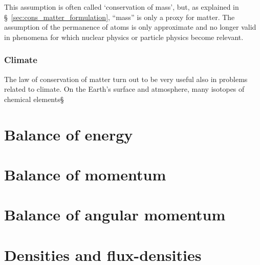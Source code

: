 \documentclass[a4paper,12pt,%
onecolumn,oneside,titlepage,%
british%
]{memoir}
\renewcommand*{\|}[1][]{\nonscript\:#1\vert\nonscript\:\mathopen{}}
\newcommand*{\sect}{\S}%
\begin{document}
This assumption is often called \enquote*{conservation of mass}, but, as explained in \sect~\ref{sec:cons_matter_formulation}, \enquote{mass} is only a proxy for matter. The assumption of the permanence of atoms is only approximate and no longer valid in phenomena for which nuclear physics or particle physics become relevant.

\subsection{Climate}
\label{sec:cons_matter_climate}

The law of conservation of matter turn out to be very useful also in problems related to climate. On the Earth's surface and atmosphere, many isotopes of chemical elements\sect




\printpagenotes*
\clearpage
\chapter{Balance of energy}
\label{cha:bal_energy}

\printpagenotes*
\clearpage
\chapter{Balance of momentum}
\label{cha:bal_momentum}

\printpagenotes*
\clearpage
\chapter{Balance of angular momentum}
\label{cha:bal_ang_momentum}

%





\smallskip


\printpagenotes*
\clearpage
\chapter{Densities and flux-densities}
\label{cha:density_fluxdensity}
\end{document}
